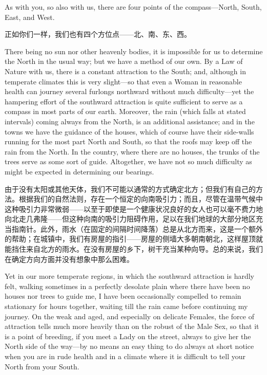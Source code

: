 \documentclass[12pt,UTF8]{ctexbook}
\begin{document}
As with you, so also with us, there are four points of the compass---North, South, East, and West.

正如你们一样，我们也有四个方位点——北、南、东、西。

There being no sun nor other heavenly bodies, it is impossible for us to determine the North in the usual way; but we have a method of our own. By a Law of Nature with us, there is a constant attraction to the South; and, although in temperate climates this is very slight---so that even a Woman in reasonable health can journey several furlongs northward without much difficulty---yet the hampering effort of the southward attraction is quite sufficient to serve as a compass in most parts of our earth. Moreover, the rain (which falls at stated intervals) coming always from the North, is an additional assistance; and in the towns we have the guidance of the houses, which of course have their side-walls running for the most part North and South, so that the roofs may keep off the rain from the North. In the country, where there are no houses, the trunks of the trees serve as some sort of guide. Altogether, we have not so much difficulty as might be expected in determining our bearings.

由于没有太阳或其他天体，我们不可能以通常的方式确定北方；但我们有自己的方法。根据我们的自然法则，存在一个恒定的向南吸引力；而且，尽管在温带气候中这种吸引力非常微弱——以至于即使是一个健康状况良好的女人也可以毫不费力地向北走几弗隆——但这种向南的吸引力阻碍作用，足以在我们地球的大部分地区充当指南针。此外，雨水（在固定的间隔时间降落）总是从北方而来，这是一个额外的帮助；在城镇中，我们有房屋的指引——房屋的侧墙大多朝南朝北，这样屋顶就能挡住来自北方的雨水。在没有房屋的乡下，树干充当某种向导。总的来说，我们在确定方向方面并没有想象中那么困难。

Yet in our more temperate regions, in which the southward attraction is hardly felt, walking sometimes in a perfectly desolate plain where there have been no houses nor trees to guide me, I have been occasionally compelled to remain stationary for hours together, waiting till the rain came before continuing my journey. On the weak and aged, and especially on delicate Females, the force of attraction tells much more heavily than on the robust of the Male Sex, so that it is a point of breeding, if you meet a Lady on the street, always to give her the North side of the way---by no means an easy thing to do always at short notice when you are in rude health and in a climate where it is difficult to tell your North from your South.
\end{document}
